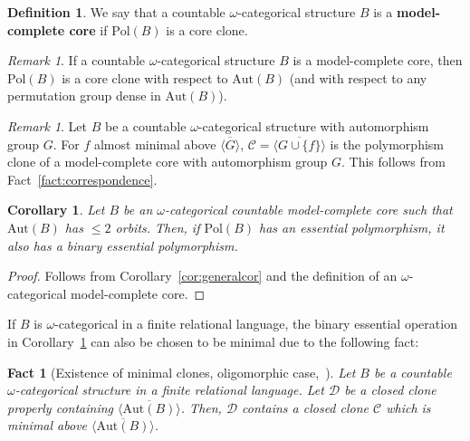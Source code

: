 \documentclass{article}
\newtheorem{corollary}[theorem]{Corollary}
\newtheorem{fact}[theorem]{Fact}
\theoremstyle{remark}
\newtheorem{remark}[theorem]{Remark}
\theoremstyle{definition}
\newtheorem{definition}[theorem]{Definition}
\begin{document}
\begin{definition}\label{mccores}  We say that a countable $\omega$-categorical structure $B$ is a \textbf{model-complete core} if $\mathrm{Pol}(B)$ is a core clone.
\end{definition}

\begin{remark}
If a countable $\omega$-categorical structure $B$ is a model-complete core, then $\mathrm{Pol}(B)$ is a core clone with respect to $\mathrm{Aut}(B)$ (and with respect to any permutation group dense in $\mathrm{Aut}(B)$).
\end{remark}

\begin{remark}\label{rem:mincor} Let $B$ be a countable $\omega$-categorical structure with automorphism group $G$. For $f$ almost minimal above $\overline{\langle G \rangle}$, $\mathcal{C}=\overline{\langle G \cup \{f\}\rangle}$ is the polymorphism clone of a model-complete core with automorphism group $G$. This follows from Fact~\ref{fact:correspondence}.
\end{remark}



\begin{corollary}\label{niceres} Let $B$ be an $\omega$-categorical countable model-complete core such that $\mathrm{Aut}(B)$ has $\leq 2$ orbits. Then, if $\mathrm{Pol}(B)$ has an essential polymorphism, it also has a binary essential polymorphism. 
\end{corollary}
\begin{proof} Follows from Corollary~\ref{cor:generalcor} and the definition of an $\omega$-categorical model-complete core.
\end{proof}

If $B$ is $\omega$-categorical in a finite relational language, the binary essential operation in Corollary~\ref{niceres} can also be chosen to be minimal due to the following fact:

\begin{fact}[Existence of minimal clones, oligomorphic case,~\cite{BodChen}]\label{existencemin} Let $B$ be a countable $\omega$-categorical structure in a finite relational language. Let $\mathcal{D}$ be a  closed clone properly containing $\overline{\langle \mathrm{Aut}(B)\rangle}$. Then, $\mathcal{D}$ contains a closed clone $\mathcal{C}$ which is minimal above $\overline{\langle \mathrm{Aut}(B)\rangle}$.
\end{fact}
\end{document}
